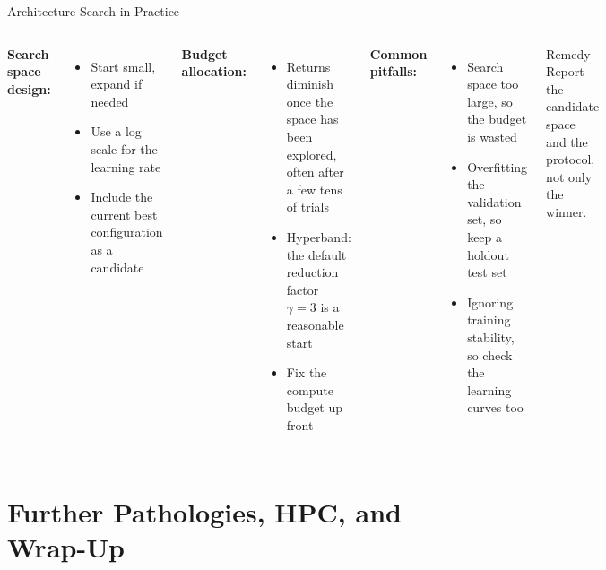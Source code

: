 \documentclass[aspectratio=169,11pt]{beamer}
\newcommand{\emphc}[1]{\textcolor{harvardcrimson}{#1}}
\begin{document}
\begin{frame}{Architecture Search in Practice}
\begin{columns}[T]
\textbf{Search space design:}
\begin{itemize}\itemsep2pt
    \item Start small, expand if needed
    \item Use a \emphc{log scale} for the learning rate
    \item Include the current best configuration as a candidate
\end{itemize}

\vspace{0.35cm}
\textbf{Budget allocation:}
\begin{itemize}\itemsep2pt
    \item Returns diminish once the space has been explored, often after a few tens of trials
    \item Hyperband: the default reduction factor $\gamma = 3$ is a reasonable start
    \item Fix the \emphc{compute budget up front}
\end{itemize}

\textbf{Common pitfalls:}
\begin{itemize}\itemsep2pt
    \item Search space too large, so the budget is wasted
    \item Overfitting the validation set, so keep a holdout test set
    \item Ignoring training stability, so check the learning curves too
\end{itemize}

\vspace{0.4cm}
\begin{exampleblock}{Remedy}
Report the candidate space and the protocol, not only the winner.
\end{exampleblock}
\end{columns}
\end{frame}


\section{Further Pathologies, HPC, and Wrap-Up}
\end{document}
